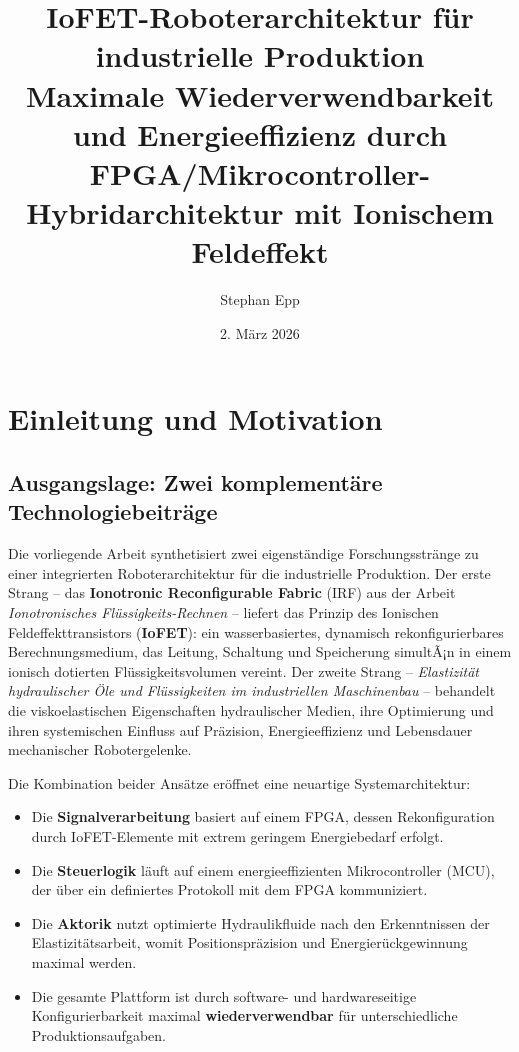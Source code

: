 ﻿\documentclass[a4paper,12pt]{scrreprt}
\title{%
  \textbf{IoFET-Roboterarchitektur für industrielle Produktion}\\[0.6em]
  \large Maximale Wiederverwendbarkeit und Energieeffizienz durch\\
  FPGA/Mikrocontroller-Hybridarchitektur mit Ionischem Feldeffekt}
\author{Stephan Epp}
\date{2. März 2026}
\theoremstyle{definition}
\begin{document}
\maketitle
\tableofcontents
\newpage

\section{Einleitung und Motivation}

\subsection{Ausgangslage: Zwei komplementäre Technologiebeiträge}

Die vorliegende Arbeit synthetisiert zwei eigenständige Forschungsstränge
zu einer integrierten Roboterarchitektur für die industrielle Produktion.
Der erste Strang -- das \textbf{Ionotronic Reconfigurable Fabric} (IRF)
aus der Arbeit \emph{Ionotronisches Flüssigkeits-Rechnen} -- liefert das
Prinzip des Ionischen Feldeffekttransistors (\textbf{IoFET}): ein
wasserbasiertes, dynamisch rekonfigurierbares Berechnungsmedium, das
Leitung, Schaltung und Speicherung simultÃ¡n in einem ionisch dotierten
Flüssigkeitsvolumen vereint. Der zweite Strang -- \emph{Elastizität
hydraulischer Öle und Flüssigkeiten im industriellen Maschinenbau} --
behandelt die viskoelastischen Eigenschaften hydraulischer Medien,
ihre Optimierung und ihren systemischen Einfluss auf Präzision,
Energieeffizienz und Lebensdauer mechanischer Robotergelenke.

Die Kombination beider Ansätze eröffnet eine neuartige Systemarchitektur:
\begin{itemize}
  \item Die \textbf{Signalverarbeitung} basiert auf einem FPGA,
        dessen Rekonfiguration durch IoFET-Elemente mit extrem geringem
        Energiebedarf erfolgt.
  \item Die \textbf{Steuerlogik} läuft auf einem energieeffizienten
        Mikrocontroller (MCU), der über ein definiertes Protokoll mit
        dem FPGA kommuniziert.
  \item Die \textbf{Aktorik} nutzt optimierte Hydraulikfluide nach den
        Erkenntnissen der Elastizitätsarbeit, womit Positionspräzision
        und Energierückgewinnung maximal werden.
  \item Die gesamte Plattform ist durch software- und hardwareseitige
        Konfigurierbarkeit maximal \textbf{wiederverwendbar} für
        unterschiedliche Produktionsaufgaben.
\end{itemize}
\end{document}
